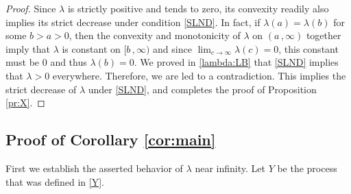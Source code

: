 \documentclass[reqno]{amsart}
\newcommand{\<}{\langle}
\renewcommand{\>}{\rangle}
\newcommand{\1}{\mathbb{1}}
\theoremstyle{definition}
\numberwithin{equation}{section}
\begin{document}
\begin{proof}
	Since $\lambda$ is strictly
	positive and tends to zero, its convexity readily also implies its strict
	decrease under condition \eqref{SLND}. In fact, if $\lambda(a) = \lambda(b)$ for some $b>a>0$, 
	then the convexity and monotonicity of $\lambda$
	on $(a\,,\infty)$ together imply that $\lambda$ is constant on 
	$[b\,,\infty)$ and  since $\lim_{c\to\infty}\lambda(c)=0$, this constant 
	must be 0 and thus $\lambda(b) = 0$. We proved in \eqref{lambda:LB} that 
	\eqref{SLND} implies that $\lambda>0$ 
	everywhere. Therefore, we are led to a contradiction.
	This implies the strict decrease of $\lambda$ under \eqref{SLND},
	and completes the proof of Proposition \ref{pr:X}.
\end{proof}

\subsection{Proof of Corollary \ref{cor:main}}

First we establish the asserted behavior of $\lambda$
near infinity. Let $Y$ be the process that was defined in \eqref{Y}.
\end{document}
